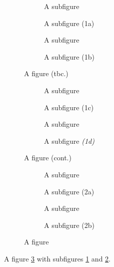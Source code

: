 \documentclass[a4paper]{article}
\begin{document}
\listoffigures
\listoftables

\clearpage

\begin{figure}
\begin{subfigure}[b]{.5\linewidth}%
  \centering A subfigure
  \caption{A subfigure (1a)}\label{fig:1a}
\end{subfigure}%
\begin{subfigure}[b]{.5\linewidth}%
  \centering A subfigure
  \caption{A subfigure (1b)}\label{fig:1b}
\end{subfigure}%
\caption{A figure (tbc.)}\label{fig:1}
\end{figure}

\begin{figure}
\ContinuedFloat
\begin{subfigure}[b]{.5\linewidth}%
  \centering A subfigure
  \caption{A subfigure (1c)}\label{fig:1c}
\end{subfigure}%
\begin{subfigure}[b]{.5\linewidth}%
  \centering A subfigure
  \newcommand\aaa{}
  \caption[A\\subfigure\\\textit{(1d)}\aaa]{A subfigure \textit{(1d)}\aaa}\label{fig:1d}
\end{subfigure}%
\caption{A figure (cont.)}\label{fig:1cont}
\end{figure}

\begin{figure}
\begin{subfigure}[b]{.5\linewidth}%
  \centering A subfigure
  \caption{A subfigure (2a)}\label{fig:2a}
\end{subfigure}%
\begin{subfigure}[b]{.5\linewidth}%
  \centering A subfigure
  \caption{A subfigure (2b)}\label{fig:2b}
\end{subfigure}%
\caption{A figure}\label{fig:2}
\end{figure}

A figure \ref{fig:1} with subfigures \ref{fig:1a} and \ref{fig:1b}.
\end{document}
